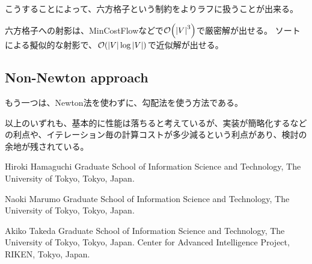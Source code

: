 \documentclass[dvipdfmx,lettersize,journal]{IEEEtran}
\begin{document}
こうすることによって、六方格子という制約をよりラフに扱うことが出来る。

六方格子への射影は、MinCostFlowなどで$\order{\abs{V}^3}$で厳密解が出せる。
ソートによる擬似的な射影で、$\order{\abs{V} \log \abs{V}}$で近似解が出せる。

\subsection{Non-Newton approach}\label{ssec:nonNewton}

もう一つは、Newton法を使わずに、勾配法を使う方法である。

以上のいずれも、基本的に性能は落ちると考えているが、実装が簡略化するなどの利点や、イテレーション毎の計算コストが多少減るという利点があり、検討の余地が残されている。

\begin{IEEEbiography}{Hiroki Hamaguchi}
  Graduate School of Information Science and Technology, The University of Tokyo, Tokyo, Japan.
\end{IEEEbiography}
\begin{IEEEbiography}{Naoki Marumo}
  Graduate School of Information Science and Technology, The University of Tokyo, Tokyo, Japan.
\end{IEEEbiography}
\begin{IEEEbiography}{Akiko Takeda}
  Graduate School of Information Science and Technology, The University of Tokyo, Tokyo, Japan.
  Center for Advanced Intelligence Project, RIKEN, Tokyo, Japan.
\end{IEEEbiography}
\end{document}
